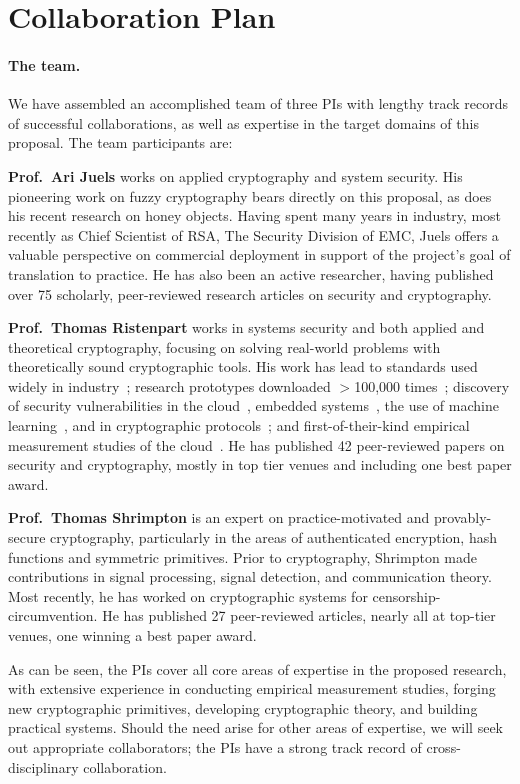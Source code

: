 \section*{Collaboration Plan}
\label{sec:collabplan}
\paragraph{The team.} We have assembled an accomplished team of three PIs with
lengthy track records of successful collaborations, as well as expertise in the
target domains of this proposal. The team participants are:

\begin{newitemize}
\item {\bf Prof.~Ari Juels} works on applied cryptography and system security. His pioneering work on fuzzy cryptography bears directly on this proposal, as does his recent research on honey objects. Having spent many years in industry, most recently as Chief Scientist of RSA, The Security Division of EMC, Juels offers a valuable perspective on commercial deployment in support of the project's goal of translation to practice. He has also been an active researcher, having published over 75 scholarly, peer-reviewed research articles on security and cryptography.
%

\item {\bf Prof.~Thomas Ristenpart} works in systems security and both applied
and theoretical cryptography, focusing on solving real-world problems with
theoretically sound cryptographic tools. His work has lead to standards used
widely in industry~\cite{BRRS09}; research prototypes downloaded $>$100,000
times~\cite{RMKK08}; discovery of security vulnerabilities in the
cloud~\cite{ristenpart2009hey,VFKRS12,zhang2012cross,ZhangEtAl:2014}, embedded
systems~\cite{Woot,davidson2013fie}, the use of machine
learning~\cite{fredrikson2014privacy}, and in cryptographic
protocols~\cite{PRS11,DRSS12:hmac,checkoway2014practical}; and
first-of-their-kind empirical measurement studies of the
cloud~\cite{he2013next,wang2014whowas}. 
He has published 42 peer-reviewed papers on security and cryptography, mostly in
top tier venues and including one best paper award. 

%
\item {\bf Prof.~Thomas Shrimpton} is an expert on practice-motivated and provably-secure 
cryptography, particularly in the areas of authenticated encryption, hash functions and symmetric primitives. Prior to cryptography, Shrimpton made contributions in signal processing, signal detection, and communication theory.  Most recently, he has worked on cryptographic systems for censorship-circumvention.  He has published 27 peer-reviewed articles, nearly all at top-tier venues, one winning a best paper award.
\end{newitemize}
As can be seen, the PIs cover all core areas of expertise in the proposed
research, with extensive experience in conducting empirical measurement studies,
forging new cryptographic primitives, developing cryptographic theory, and
building practical systems. Should the need arise for other areas of expertise,
we will seek out appropriate collaborators; the PIs have a strong
track record of cross-disciplinary collaboration.

